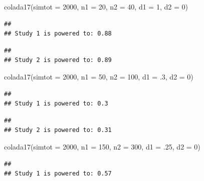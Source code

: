 \documentclass[
]{book}
\newenvironment{Shaded}{\begin{snugshade}}{\end{snugshade}}
\newcommand{\AttributeTok}[1]{\textcolor[rgb]{0.77,0.63,0.00}{#1}}
\newcommand{\DecValTok}[1]{\textcolor[rgb]{0.00,0.00,0.81}{#1}}
\newcommand{\FunctionTok}[1]{\textcolor[rgb]{0.00,0.00,0.00}{#1}}
\newcommand{\NormalTok}[1]{#1}
\begin{document}
\begin{Shaded}
\begin{Highlighting}[]
  \FunctionTok{colada17}\NormalTok{(}\AttributeTok{simtot =} \DecValTok{2000}\NormalTok{, }\AttributeTok{n1 =} \DecValTok{20}\NormalTok{, }\AttributeTok{n2 =} \DecValTok{40}\NormalTok{, }\AttributeTok{d1 =} \DecValTok{1}\NormalTok{, }\AttributeTok{d2 =} \DecValTok{0}\NormalTok{)  }
\end{Highlighting}
\end{Shaded}

\begin{verbatim}
## 
## Study 1 is powered to: 0.88
\end{verbatim}

\begin{verbatim}
## 
## Study 2 is powered to: 0.89
\end{verbatim}

\begin{Shaded}
\begin{Highlighting}[]
  \FunctionTok{colada17}\NormalTok{(}\AttributeTok{simtot =} \DecValTok{2000}\NormalTok{, }\AttributeTok{n1 =} \DecValTok{50}\NormalTok{, }\AttributeTok{n2 =} \DecValTok{100}\NormalTok{, }\AttributeTok{d1 =}\NormalTok{ .}\DecValTok{3}\NormalTok{, }\AttributeTok{d2 =} \DecValTok{0}\NormalTok{)}
\end{Highlighting}
\end{Shaded}

\begin{verbatim}
## 
## Study 1 is powered to: 0.3
\end{verbatim}

\begin{verbatim}
## 
## Study 2 is powered to: 0.31
\end{verbatim}

\begin{Shaded}
\begin{Highlighting}[]
  \FunctionTok{colada17}\NormalTok{(}\AttributeTok{simtot =} \DecValTok{2000}\NormalTok{, }\AttributeTok{n1 =} \DecValTok{150}\NormalTok{, }\AttributeTok{n2 =} \DecValTok{300}\NormalTok{, }\AttributeTok{d1 =}\NormalTok{ .}\DecValTok{25}\NormalTok{, }\AttributeTok{d2 =} \DecValTok{0}\NormalTok{)}
\end{Highlighting}
\end{Shaded}

\begin{verbatim}
## 
## Study 1 is powered to: 0.57
\end{verbatim}
\end{document}
